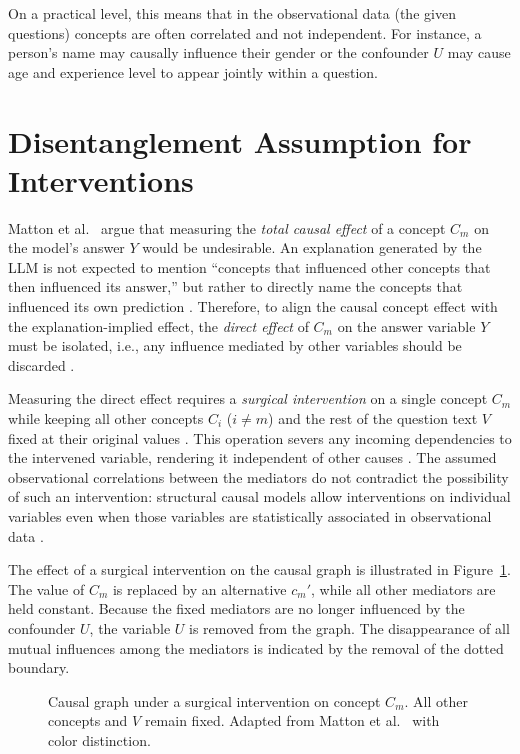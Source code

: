 On a practical level, this means that in the observational data (the given questions) concepts are often correlated and not independent. For instance, a person's name may causally influence their gender or the confounder $U$ may cause age and experience level to appear jointly within a question.

\section{Disentanglement Assumption for Interventions}

Matton et al.~\cite{mattonWalkTalkMeasuring2024} argue that measuring the \emph{total causal effect} of a concept $C_m$ on the model's answer $Y$ would be undesirable. An explanation generated by the LLM is not expected to mention \enquote{concepts that influenced other concepts that then influenced its answer,} but rather to directly name the concepts that influenced its own prediction \cite{mattonWalkTalkMeasuring2024}. Therefore, to align the causal concept effect with the explanation-implied effect, the \emph{direct effect} of $C_m$ on the answer variable $Y$ must be isolated, i.e., any influence mediated by other variables should be discarded \cite{pearlCausality2009}.

Measuring the direct effect requires a \emph{surgical intervention} on a single concept $C_m$ while keeping all other concepts $C_i$ ($i \neq m$) and the rest of the question text $V$ fixed at their original values \cite{pearlCausality2009}. This operation severs any incoming dependencies to the intervened variable, rendering it independent of other causes \cite{pearlCausality2009, eberhardtInterventionsCausalInference2007}. The assumed observational correlations between the mediators do not contradict the possibility of such an intervention: structural causal models allow interventions on individual variables even when those variables are statistically associated in observational data \cite{pearlCausality2009}.

The effect of a surgical intervention on the causal graph is illustrated in Figure~\ref{fig:matton_dgp_intervened}. The value of $C_m$ is replaced by an alternative $c_m'$, while all other mediators are held constant. Because the fixed mediators are no longer influenced by the confounder $U$, the variable $U$ is removed from the graph. The disappearance of all mutual influences among the mediators is indicated by the removal of the dotted boundary.

\begin{figure}[ht]
	\centering
	
	\caption[Causal graph under a surgical intervention on a single concept]{Causal graph under a surgical intervention on concept $C_m$. All other concepts and $V$ remain fixed. Adapted from Matton et al.~\cite{mattonWalkTalkMeasuring2024} with color distinction.}
	\label{fig:matton_dgp_intervened}
\end{figure}

